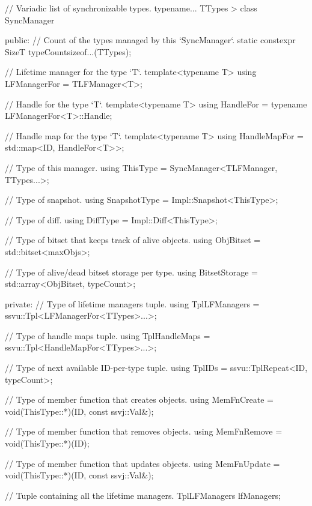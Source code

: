 \documentclass{report}
\begin{document}
        // Variadic list of synchronizable types.
        typename... TTypes
    > 
    class SyncManager
    {
        public:
            // Count of the types managed by this `SyncManager`.
            static constexpr SizeT typeCount{sizeof...(TTypes)};

            // Lifetime manager for the type `T`.
            template<typename T> using LFManagerFor = TLFManager<T>;

            // Handle for the type `T`.
            template<typename T> using HandleFor = typename LFManagerFor<T>::Handle;

            // Handle map for the type `T`.
            template<typename T> using HandleMapFor = std::map<ID, HandleFor<T>>;

            // Type of this manager.
            using ThisType = SyncManager<TLFManager, TTypes...>;

            // Type of snapshot.
            using SnapshotType = Impl::Snapshot<ThisType>;

            // Type of diff.
            using DiffType = Impl::Diff<ThisType>;

            // Type of bitset that keeps track of alive objects.
            using ObjBitset = std::bitset<maxObjs>;

            // Type of alive/dead bitset storage per type.
            using BitsetStorage = std::array<ObjBitset, typeCount>;

        private:
            // Type of lifetime managers tuple.
            using TplLFManagers = ssvu::Tpl<LFManagerFor<TTypes>...>;

            // Type of handle maps tuple.
            using TplHandleMaps = ssvu::Tpl<HandleMapFor<TTypes>...>;

            // Type of next available ID-per-type tuple.
            using TplIDs = ssvu::TplRepeat<ID, typeCount>;

            // Type of member function that creates objects.
            using MemFnCreate = void(ThisType::*)(ID, const ssvj::Val&);

            // Type of member function that removes objects.
            using MemFnRemove = void(ThisType::*)(ID);

            // Type of member function that updates objects.
            using MemFnUpdate = void(ThisType::*)(ID, const ssvj::Val&);

            // Tuple containing all the lifetime managers.
            TplLFManagers lfManagers;

}
\end{document}
